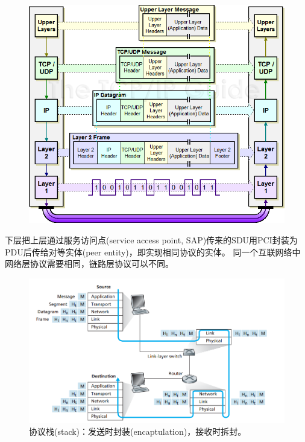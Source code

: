 \begin{minipage}{0.4\linewidth}
\begin{center}
\end{center}
\end{minipage}
\begin{minipage}{0.6\linewidth}
\begin{figure}[H]
	\centering
	\includegraphics[width=\linewidth]{fig/ipencap.png}
\end{figure}
\end{minipage}

\bigskip
下层把上层通过服务访问点(service access point, SAP)传来的SDU用PCI封装为PDU后传给对等实体(peer entity)，即实现相同协议的实体。
同一个互联网络中网络层协议需要相同，链路层协议可以不同。

\myhline
\begin{figure}[H]
	\centering
	\includegraphics[width=0.8\linewidth]{fig/network-flow.PNG}
	\caption*{协议栈(stack)：发送时封装(encaptulation)，接收时拆封。}
\end{figure}

